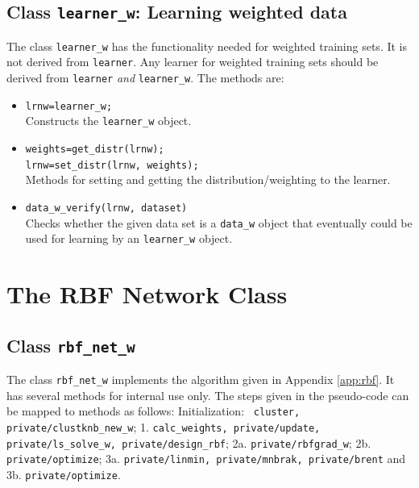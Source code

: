 \documentclass{article}
\begin{document}
\subsection{Class {\tt learner\_w}: Learning weighted data}
The class {\tt learner\_w} has the functionality needed for weighted training
sets. It is not derived from {\tt learner}. Any learner for weighted training
sets should be derived from {\tt learner} {\em and} {\tt learner\_w}. The
methods are:
\begin{itemize}
\item {\tt lrnw=learner\_w;}\\
Constructs the {\tt learner\_w} object.
\item {\tt weights=get\_distr(lrnw);\\
    lrnw=set\_distr(lrnw, weights);}\\
  Methods for setting and getting the distribution/weighting to the learner.
\item {\tt data\_w\_verify(lrnw, dataset)}\\
  Checks whether the given data set is a {\tt data\_w} object that eventually
  could be used for learning by an {\tt learner\_w} object.
\end{itemize}

\section{The RBF Network Class}
\subsection{Class {\tt rbf\_net\_w}}
The class {\tt rbf\_net\_w} implements the algorithm given in Appendix
\ref{app:rbf}. It has several methods for internal use only. The steps given
in the pseudo-code can be mapped to methods as follows: Initialization: {\tt
  cluster, private/clustknb\_new\_w}; 1. {\tt calc\_weights, private/update,
  private/ls\_solve\_w, private/design\_rbf}; 2a. {\tt private/rbfgrad\_w};
2b. {\tt private/optimize}; 3a. {\tt private/linmin, private/mnbrak,
  private/brent} and 3b. {\tt private/optimize}.
\end{document}
